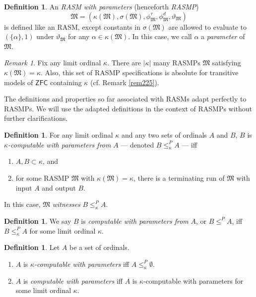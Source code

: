 \documentclass[12pt, twoside]{memoir}
\numberwithin{equation}{section}
\theoremstyle{definition}
\newtheorem{defi}[thm]{Definition}
\theoremstyle{remark}
\newtheorem{rem}[thm]{Remark}
\theoremstyle{definition}
\theoremstyle{definition}
\theoremstyle{definition}
\theoremstyle{remark}
\begin{document}
\begin{defi}
An \emph{RASM with parameters} (henceforth \emph{RASMP}) 
\begin{equation*}
    \mathfrak{M} = (\kappa(\mathfrak{M}), \sigma(\mathfrak{M}), \phi^{\tau}_{\mathfrak{M}}, \phi^d_{\mathfrak{M}}, \vartheta_{\mathfrak{M}})
\end{equation*} 
is defined like an RASM, except constants in $\sigma(\mathfrak{M})$ are allowed to evaluate to $(\{\alpha\}, 1)$ under $\vartheta_{\mathfrak{M}}$ for any $\alpha \in \kappa(\mathfrak{M})$. In this case, we call $\alpha$ a \emph{parameter} of $\mathfrak{M}$.
\end{defi}

\begin{rem}\label{rem248}
Fix any limit ordinal $\kappa$. There are $|\kappa|$ many RASMPs $\mathfrak{M}$ satisfying $\kappa(\mathfrak{M}) = \kappa$. Also, this set of RASMP specifications is absolute for transitive models of $\mathsf{ZFC}$ containing $\kappa$ (cf. Remark \ref{rem225}).
\end{rem}

The definitions and properties so far associated with RASMs adapt perfectly to RASMPs. We will use the adapted definitions in the context of RASMPs without further clarifications.

\begin{defi}\label{def38}
For any limit ordinal $\kappa$ and any two sets of ordinals $A$ and $B$, $B$ is $\kappa$\emph{-computable with parameters from} $A$ --- denoted $B \leq^P_{\kappa} A$ --- iff 
\begin{enumerate}[label=(\alph*)]
    \item $A, B \subset \kappa$, and
    \item for some RASMP $\mathfrak{M}$ with $\kappa(\mathfrak{M}) = \kappa$, there is a terminating run of $\mathfrak{M}$ with input $A$ and output $B$. 
\end{enumerate}
In this case, $\mathfrak{M}$ \emph{witnesses} $B \leq^P_{\kappa} A$.
\end{defi}

\begin{defi}
We say $B$ is \emph{computable with parameters from} $A$, or $B \leq^P A$, iff $B \leq^P_{\kappa} A$ for some limit ordinal $\kappa$.
\end{defi}

\begin{defi}
Let $A$ be a set of ordinals.
\begin{enumerate}[label=(\arabic*)]
    \item $A$ is $\kappa$\emph{-computable with parameters} iff $A \leq^P_{\kappa} \emptyset$.
    \item $A$ is \emph{computable with parameters} iff $A$ is $\kappa$-computable with parameters for some limit ordinal $\kappa$.
\end{enumerate}
\end{defi}
\end{document}
